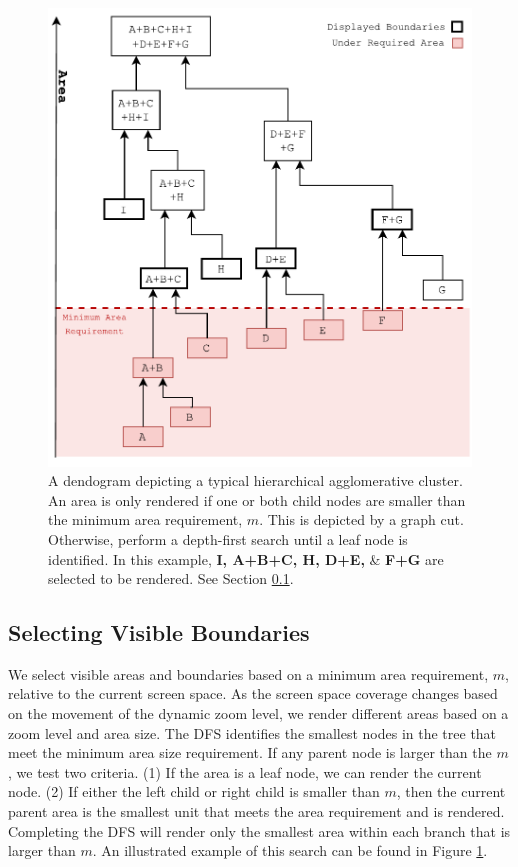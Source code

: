 \begin{figure}[ht]
\centering
\includegraphics[width=0.7\linewidth]{images/displayBoundaries}
\caption{A dendogram depicting a typical hierarchical agglomerative cluster. An area is only rendered if one or both child nodes are smaller than the minimum area requirement, $m$. This is depicted by a graph cut. Otherwise, perform a depth-first search until  a leaf node is identified. In this example, \textbf{I, A+B+C, H, D+E,} \& \textbf{F+G} are selected to be rendered. See Section \ref{visible}. } \vspace{-0.2cm} \label{fig:display}
\end{figure}

\subsection{Selecting Visible Boundaries} \label{visible}
We select visible areas and boundaries based on a minimum area requirement, $m$, relative to the current screen space. As the screen space coverage changes based on the movement of the dynamic zoom level, we render different areas based on a zoom level and area size. The DFS identifies the smallest nodes in the tree that meet the minimum area size requirement. If any parent node is larger than the $m$, we test two criteria. (1) If the area is a leaf node, we can render the current node. (2) If either the left child or right child is smaller than $m$, then the current parent area is the smallest unit that meets the area requirement and is rendered. Completing the DFS will render only the smallest area within each branch that is larger than $m$. An illustrated example of this search can be found in Figure \ref{fig:display}. 

